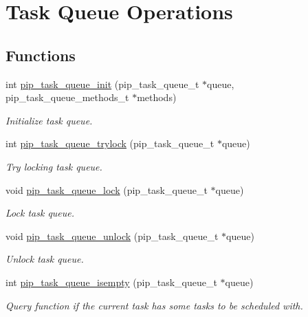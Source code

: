 \hypertarget{group__ulp-1-task-queue}{\section{Task Queue Operations}
\label{group__ulp-1-task-queue}
}
\subsection*{Functions}
\begin{DoxyCompactItemize}
\item 
int \hyperlink{group__ulp-1-task-queue_ga9c50d9b2b810d97a75a5fe9c332902e0}{pip\-\_\-task\-\_\-queue\-\_\-init} (pip\-\_\-task\-\_\-queue\-\_\-t $\ast$queue, pip\-\_\-task\-\_\-queue\-\_\-methods\-\_\-t $\ast$methods)
\begin{DoxyCompactList}\small\item\em Initialize task queue. \end{DoxyCompactList}\item 
int \hyperlink{group__ulp-1-task-queue_ga20d50746c585f1ede68f2c9aefc39a5c}{pip\-\_\-task\-\_\-queue\-\_\-trylock} (pip\-\_\-task\-\_\-queue\-\_\-t $\ast$queue)
\begin{DoxyCompactList}\small\item\em Try locking task queue. \end{DoxyCompactList}\item 
void \hyperlink{group__ulp-1-task-queue_gaf7f6e26e29752a148704108bdcc7756f}{pip\-\_\-task\-\_\-queue\-\_\-lock} (pip\-\_\-task\-\_\-queue\-\_\-t $\ast$queue)
\begin{DoxyCompactList}\small\item\em Lock task queue. \end{DoxyCompactList}\item 
void \hyperlink{group__ulp-1-task-queue_gaf4cfe9905f1862718f65ba2fda961b84}{pip\-\_\-task\-\_\-queue\-\_\-unlock} (pip\-\_\-task\-\_\-queue\-\_\-t $\ast$queue)
\begin{DoxyCompactList}\small\item\em Unlock task queue. \end{DoxyCompactList}\item 
int \hyperlink{group__ulp-1-task-queue_gabf772cd5ea121458291801a26dea5c9d}{pip\-\_\-task\-\_\-queue\-\_\-isempty} (pip\-\_\-task\-\_\-queue\-\_\-t $\ast$queue)
\begin{DoxyCompactList}\small\item\em Query function if the current task has some tasks to be scheduled with. \end{DoxyCompactList}\item 

\end{DoxyCompactItemize}
